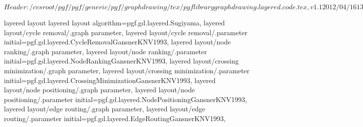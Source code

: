 %
%
%

\ProvidesFileRCS[v\pgfversion] $Header: /cvsroot/pgf/pgf/generic/pgf/graphdrawing/tex/pgflibrarygraphdrawing.layered.code.tex,v 1.1 2012/04/16 13:23:56 tantau Exp $






%
%




%
%
\pgfgddeclarealgorithmkey
  {layered layout}
  {layered layout}
  {
    algorithm=pgf.gd.layered.Sugiyama,
    layered layout/cycle removal/.graph parameter,
    layered layout/cycle removal/.parameter initial=pgf.gd.layered.CycleRemovalGansnerKNV1993,
    layered layout/node ranking/.graph parameter,
    layered layout/node ranking/.parameter initial=pgf.gd.layered.NodeRankingGansnerKNV1993,
    layered layout/crossing minimization/.graph parameter,
    layered layout/crossing minimization/.parameter initial=pgf.gd.layered.CrossingMinimizationGansnerKNV1993,
    layered layout/node positioning/.graph parameter,
    layered layout/node positioning/.parameter initial=pgf.gd.layered.NodePositioningGansnerKNV1993,
    layered layout/edge routing/.graph parameter,
    layered layout/edge routing/.parameter initial=pgf.gd.layered.EdgeRoutingGansnerKNV1993,
  }




\endinput

